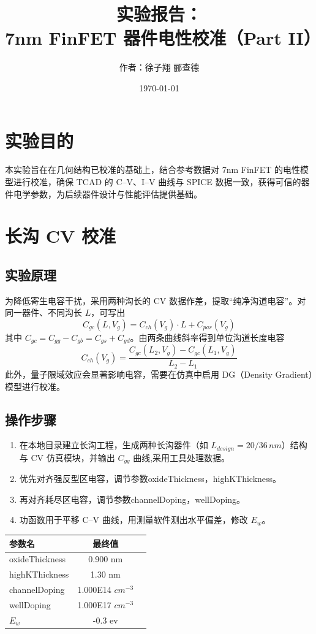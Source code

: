\documentclass[12pt, a4paper, UTF8]{article}
\title{实验报告：\\7nm FinFET 器件电性校准（Part II）}
\author{作者：徐子翔 \hspace{0.2cm} 郦查德}
\date{\today}
\begin{document}
\maketitle

\section{实验目的}
本实验旨在在几何结构已校准的基础上，结合参考数据对 7nm FinFET 的电性模型进行校准，确保 TCAD 的 C--V、I--V 曲线与 SPICE 数据一致，获得可信的器件电学参数，为后续器件设计与性能评估提供基础。


\section{长沟 CV 校准}
\subsection{实验原理}
为降低寄生电容干扰，采用两种沟长的 CV 数据作差，提取“纯净沟道电容”。对同一器件、不同沟长 $L$，可写出
\begin{equation}
C_{gc}(L, V_g)=C_{ch}(V_g)\cdot L + C_{par}(V_g)
\end{equation}
其中 $C_{gc}=C_{gg}-C_{gb}=C_{gs}+C_{gd}$。由两条曲线斜率得到单位沟道长度电容
\begin{equation}
C_{ch}(V_g)=\frac{C_{gc}(L_2,V_g)-C_{gc}(L_1,V_g)}{L_2-L_1}
\end{equation}
此外，量子限域效应会显著影响电容，需要在仿真中启用 DG（Density Gradient）模型进行校准。

\subsection{操作步骤}
\begin{enumerate}
    \item 在本地目录建立长沟工程，生成两种长沟器件（如 $L_{design}=20/36\,\si{nm}$）结构与 CV 仿真模块，并输出 $C_{gg}$ 曲线,采用工具处理数据。
    \item 优先对齐强反型区电容，调节参数oxideThickness，highKThickness。
    \item 再对齐耗尽区电容，调节参数channelDoping，wellDoping。
    \item 功函数用于平移 C--V 曲线，用测量软件测出水平偏差，修改 $E_w$。
\end{enumerate}

\begin{table}[H]
    \centering
    \large
    \begin{tabular}{lcc} %
        \toprule
        \textbf{参数名} & \textbf{最终值} \\
        \midrule
        oxideThickness & 0.900 nm \\
        highKThickness & 1.30 nm \\
        channelDoping & 1.000E14 $cm^{-3}$ \\
        wellDoping & 1.000E17 $cm^{-3}$\\
        $E_w$ & -0.3 ev \\
        \bottomrule
    \end{tabular}
\end{table}
\end{document}
